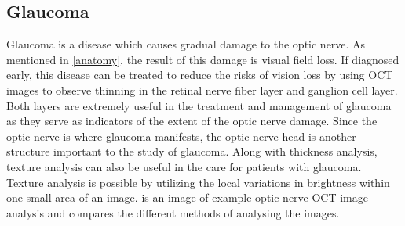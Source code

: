 \subsection{Glaucoma}
Glaucoma is a disease which causes gradual damage to the optic nerve.  
As mentioned in \cref{anatomy}, the result of this damage is visual field 
loss. \cite{mbib_6} If diagnosed early, this 
disease can be treated to reduce the risks of vision loss by using OCT 
images to observe thinning in the retinal nerve fiber layer and ganglion cell 
layer.  Both layers are extremely useful in the treatment and management 
of glaucoma as they serve as indicators of the extent of the optic nerve 
damage. \cite{mbib_4}
Since the optic nerve is where glaucoma manifests, the optic nerve head 
is another structure important to the study of glaucoma. \cite{mbib_4}
Along with thickness analysis, texture analysis can also be useful in the 
care for patients with glaucoma.  Texture analysis is possible by utilizing 
the local variations in brightness within one small area of an 
image. \cite{mbib_12}  is an image of example optic nerve 
OCT image analysis and compares the different methods of analysing 
the images.

